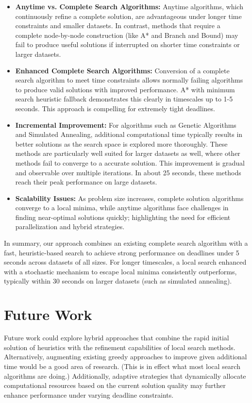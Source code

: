 \documentclass[11pt]{article}
\begin{document}
	\begin{itemize}[noitemsep]
		\item \textbf{Anytime vs. Complete Search Algorithms:} Anytime algorithms, which continuously refine a complete solution, are advantageous under longer time constraints and smaller datasets. In contrast, methods that require a complete node-by-node construction (like A* and Branch and Bound) may fail to produce useful solutions if interrupted on shorter time constraints or larger datasets.
		\item \textbf {Enhanced Complete Search Algorithms:} Conversion of a complete search algorithm to meet time constraints allows normally failing algorithms to produce valid solutions with improved performance. A* with minimum search heuristic fallback demonstrates this clearly in timescales up to 1-5 seconds. This approach is compelling for extremely tight deadlines.
		\item \textbf{Incremental Improvement:} For algorithms such as Genetic Algorithms and Simulated Annealing, additional computational time typically results in better solutions as the search space is explored more thoroughly. These methods are particularly well suited for larger datasets as well, where other methods fail to converge to a accurate solution. This improvement is gradual and observable over multiple iterations. In about 25 seconds, these methods reach their peak performance on large datasets. 
		\item \textbf{Scalability Issues:} As problem size increases, complete solution algorithms converge to a local minima, while anytime algorithms face challenges in finding near-optimal solutions quickly; highlighting the need for efficient parallelization and hybrid strategies.
	\end{itemize}
	
	In summary, our approach combines an existing complete search algorithm with a fast, heuristic-based search to achieve strong performance on deadlines under 5 seconds across datasets of all sizes. For longer timescales, a local search enhanced with a stochastic mechanism to escape local minima consistently outperforms, typically within 30 seconds on larger datasets (such as simulated annealing).

	\section{Future Work}
	
	Future work could explore hybrid approaches that combine the rapid initial solution of heuristics with the refinement capabilities of local search methods. Alternatively, augmenting existing greedy approaches to improve given additional time would be a good area of research. (This is in effect what most local search algorithms are doing.) Additionally, adaptive strategies that dynamically allocate computational resources based on the current solution quality may further enhance performance under varying deadline constraints.
	
\end{document}
